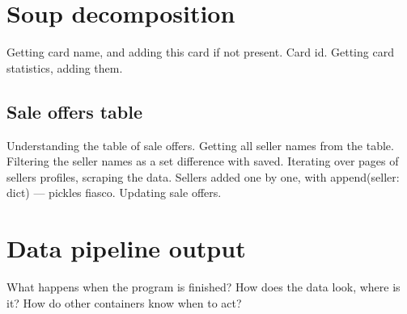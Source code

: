 \section{Soup decomposition}
Getting card name, and adding this card if not present. Card id.
Getting card statistics, adding them.

\subsection{Sale offers table}
Understanding the table of sale offers.
Getting all seller names from the table.
Filtering the seller names as a set difference with saved.
Iterating over pages of sellers profiles, scraping the data.
Sellers added one by one, with append(seller: dict) --- pickles fiasco.
Updating sale offers.


\section{Data pipeline output}
What happens when the program is finished?
How does the data look, where is it?
How do other containers know when to act?

